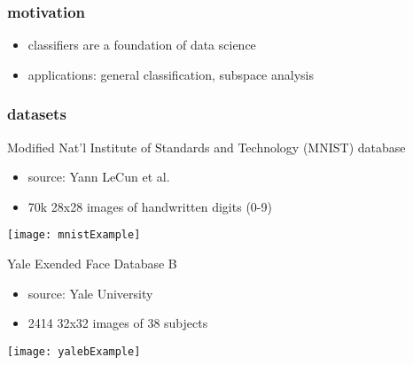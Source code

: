 \begin{frame}
\frametitle{motivation}
	
	\begin{itemize}
		\item classifiers are a foundation of data science
		\item applications: general classification, subspace analysis
	\end{itemize}

\end{frame}

\begin{frame}
\frametitle{datasets}
	
Modified Nat'l Institute of Standards and Technology (MNIST) database
	\begin{itemize}
		\setlength{\itemindent}{4em}
		\item source: Yann LeCun et al. \cite{lecun-mnisthandwrittendigit-2010}
		\item 70k 28x28 images of handwritten digits (0-9)
	\end{itemize}

	{
          \begin{center}
	  \texttt{[image: mnistExample]}
          \end{center}
	}

Yale Exended Face Database B
	\begin{itemize}
		\setlength{\itemindent}{4em}
		\item source: Yale University \cite{yaleB}
		\item 2414 32x32 images of 38 subjects
	\end{itemize}

	{
          \begin{center}
	  \texttt{[image: yalebExample]}
          \end{center}
	}

\end{frame}